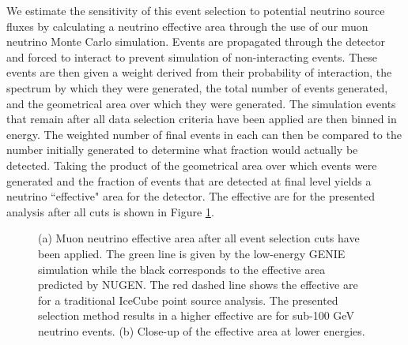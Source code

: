 \documentclass{gatech-thesis}
\begin{document}
We estimate the sensitivity of this event selection to potential neutrino source fluxes by calculating a neutrino effective area through the use of our muon neutrino Monte Carlo simulation. Events are propagated through the detector and forced to interact to prevent simulation of non-interacting events. These events are then given a weight derived from their probability of interaction, the spectrum by which they were generated, the total number of events generated, and the geometrical area over which they were generated. The simulation events that remain after all data selection criteria have been applied are then binned in energy. The weighted number of final events in each can then be compared to the number initially generated to determine what fraction would actually be detected. Taking the product of the geometrical area over which events were generated and the fraction of events that are detected at final level yields a neutrino ``effective" area for the detector. The effective are for the presented analysis after all cuts is shown in Figure \ref{fig:EffAreaFinal}.
\begin{figure}\label{fig:EffAreaFinal}
\centering
{}
\caption[Final Level Neutrino Effective Area]{(a) Muon neutrino effective area after all event selection cuts have been applied. The green line is given by the low-energy GENIE simulation while the black corresponds to the effective area predicted by NUGEN. The red dashed line shows the effective are for a traditional IceCube point source analysis. The presented selection method results in a higher effective are for sub-100 GeV neutrino events. (b) Close-up of the effective area at lower energies.} 
\end{figure}
\end{document}

